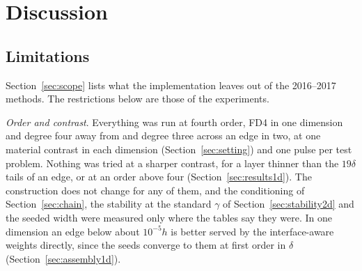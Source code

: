 \documentclass[11pt]{amsart}
\theoremstyle{definition}
\theoremstyle{remark}
\newcommand{\para}[1]{\par\smallskip\noindent\textit{#1}.\enspace}
\begin{document}
\section{Discussion}
\label{sec:discussion}

\subsection{Limitations}
\label{sec:limitations}
Section~\ref{sec:scope} lists what the implementation leaves out of the
2016--2017 methods. The restrictions below are those of the experiments.

\para{Order and contrast}
Everything was run at fourth order, FD4 in one dimension and degree four
away from and degree three across an edge in two, at one material
contrast in each dimension (Section~\ref{sec:setting}) and one pulse per
test problem. Nothing was tried at a sharper contrast, for a layer
thinner than the $19\delta$ tails of an edge, or at an order above four
(Section~\ref{sec:results1d}). The construction does not change for any
of them, and the conditioning of Section~\ref{sec:chain}, the stability
at the standard $\gamma$ of Section~\ref{sec:stability2d} and the seeded
width were measured only where the tables say they were. In one
dimension an edge below about $10^{-5} h$ is better served by the
interface-aware weights directly, since the seeds converge to them at
first order in $\delta$ (Section~\ref{sec:assembly1d}).
\end{document}
